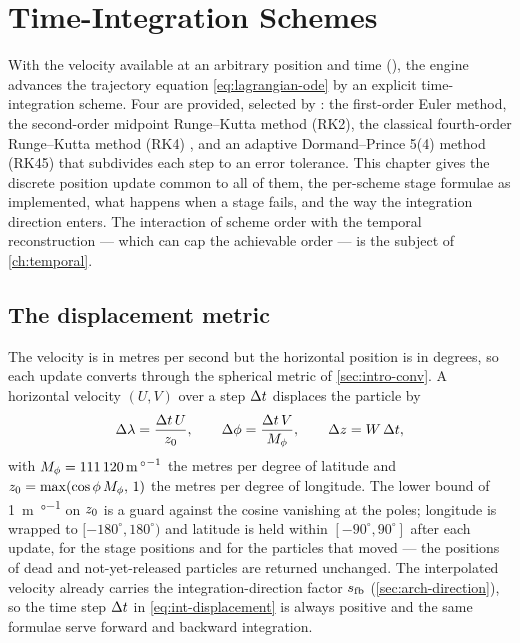 \chapter{Time-Integration Schemes}\label{ch:integration}

With the velocity available at an arbitrary position and time (),
the engine advances the trajectory equation \cref{eq:lagrangian-ode} by an explicit
time-integration scheme. Four are provided, selected by : the
first-order Euler method, the second-order midpoint Runge--Kutta method (RK2), the
classical fourth-order Runge--Kutta method (RK4) \citep{butcher2016numerical}, and an adaptive
Dormand--Prince 5(4) method (RK45) \citep{dormand1980family} that subdivides each step to an error
tolerance. This chapter gives the discrete position update common to all of them, the per-scheme
stage formulae as implemented, what happens when a stage fails, and the way the integration
direction enters. The interaction
of scheme order with the temporal reconstruction --- which can cap the achievable order
--- is the subject of \cref{ch:temporal}.

\section{The displacement metric}\label{sec:int-metric}

The velocity is in metres per second but the horizontal position is in degrees, so each
update converts through the spherical metric of \cref{sec:intro-conv}. A horizontal
velocity $(U,V)$ over a step $\Delta t$ displaces the particle by
\begin{equation}\label{eq:int-displacement}
  \Delta\lambda = \frac{\Delta t\,U}{z_{0}}, \qquad
  \Delta\phi = \frac{\Delta t\,V}{M_{\phi}}, \qquad
  \Delta z = W\,\Delta t,
\end{equation}
with $M_{\phi}=\SI{111120}{\metre\per\degree}$ the metres per degree of latitude and
$z_{0}=\max(\cos\phi\,M_{\phi},\,1)$ the metres per degree of longitude. The lower bound
of \SI{1}{\metre\per\degree} on $z_{0}$ is a guard against the cosine vanishing at the
poles; longitude is wrapped to $[-180^{\circ},180^{\circ})$ and latitude is held within
$[-90^{\circ},90^{\circ}]$ after each update, for the stage positions and for the particles that
moved --- the positions of dead and not-yet-released particles are returned unchanged. The interpolated velocity already carries
the integration-direction factor $s_{\mathrm{fb}}$ (\cref{sec:arch-direction}), so the time step
$\Delta t$ in \cref{eq:int-displacement} is always positive and the same formulae serve
forward and backward integration.


